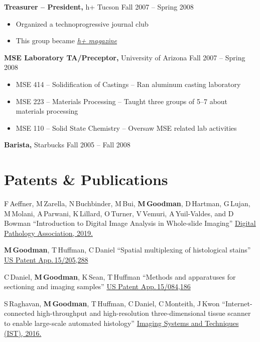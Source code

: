 \documentclass{res}
\let\oldsection\section
\renewcommand{\section}[1]{\needspace{4\baselineskip}\oldsection{#1}}
\begin{document}
\begin{resume}
{\bf Treasurer -- President,} h+ Tucson \hfill Fall 2007 -- Spring 2008
\begin{itemize} \itemsep -2pt
  \item Organized a technoprogressive journal club
  \item This group became \href{http://hplusmagazine.com/}{\textit{h+ magazine}}
\end{itemize}

{\bf MSE Laboratory TA/Preceptor,} University of Arizona \hfill Fall 2007 -- Spring 2008
\begin{itemize} \itemsep -2pt
  \item MSE 414 -- Solidification of Castings -- Ran aluminum casting laboratory
  \item MSE 223 -- Materials Processing -- Taught three groups of 5--7 about materials processing
  \item MSE 110 -- Solid State Chemistry -- Oversaw MSE related lab activities
\end{itemize}

{\bf Barista,} Starbucks \hfill Fall 2005 -- Fall 2008

\section{Patents \& Publications}

  F\,Aeffner, M\,Zarella, N\,Buchbinder, M\,Bui, \textbf{M\,Goodman}, 
  D\,Hartman, G\,Lujan, M\,Molani, A\,Parwani, K\,Lillard, O\,Turner,
  V\,Vemuri, A\,Yuil-Valdes, and D\,Bowman
  ``Introduction to Digital Image Analysis in Whole-slide Imaging''
  \href{http://www.jpathinformatics.org/temp/JPatholInform1019-318182_000518.pdf}{Digital Pathology Association, 2019.}

  \textbf{M\,Goodman}, T\,Huffman, C\,Daniel
  ``Spatial multiplexing of histological stains''
  \href{https://patents.google.com/patent/US20170011511A1/en}{US Patent App.\,15/205,288}

  C\,Daniel, \textbf{M\,Goodman}, K\,Sean, T\,Huffman
  ``Methods and apparatuses for sectioning and imaging samples''
  \href{https://patents.google.com/patent/US20160290895A1/en}{US Patent App.\,15/084,186}

  S\,Raghavan, \textbf{M\,Goodman}, T\,Huffman, C\,Daniel, C\,Monteith, J\,Kwon
  ``Internet-connected high-throughput and high-resolution three-dimensional tissue scanner to
  enable large-scale automated histology''
  \href{https://doi.org/10.1109/IST.2016.7738254}{Imaging Systems and Techniques (IST), 2016.}


\end{resume}
\end{document}

